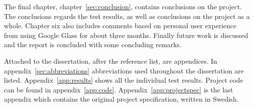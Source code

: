 The final chapter, chapter~\ref{sec:conclusion}, contains conclusions on the project. The conclusions regards the test results, as well as conclusions on the project as a whole. Chapter six also includes comments based on personal user experience from using Google Glass for about three months. Finally future work is discussed and the report is concluded with some concluding remarks.

Attached to the dissertation, after the reference list, are appendices. In appendix~\ref{sec:abbreviations} abbreviations used throughout the dissertation are listed. Appendix~\ref{app:results} shows all the individual test results. Project code can be found in appendix~\ref{app:code}. Appendix~\ref{app:projectspec} is the last appendix which contains the original project specification, written in Swedish.